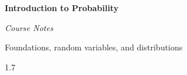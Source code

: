 \documentclass[12pt,a4paper]{report}
\theoremstyle{definition}
\theoremstyle{plain}
\theoremstyle{definition}
\begin{document}
\begin{titlepage}
\thispagestyle{empty}
\begin{center}

    \centering

\vspace{4cm}
{\Huge\bfseries Introduction to Probability}

\vspace{0.6cm}
{\Large\itshape Course Notes}

\vfill
{\large Foundations, random variables, and distributions}

\end{center}
\clearpage

\end{titlepage}













\newpage
\begin{spacing}{1.7}
\tableofcontents
\end{spacing}

\newpage

















\newpage
{}


\end{document}
